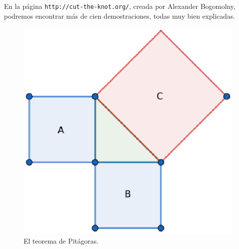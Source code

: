 En la página
\verb+http://cut-the-knot.org/+, creada por Alexander Bogomolny, podremos
encontrar más de cien demostraciones, todas muy bien explicadas.  

%

\begin{figure}
   \centering
   \includegraphics[scale=0.5]{images/thm_pitagoras}
   \caption{El teorema de Pitágoras.}
   \label{fig:pitagoras}
\end{figure}

